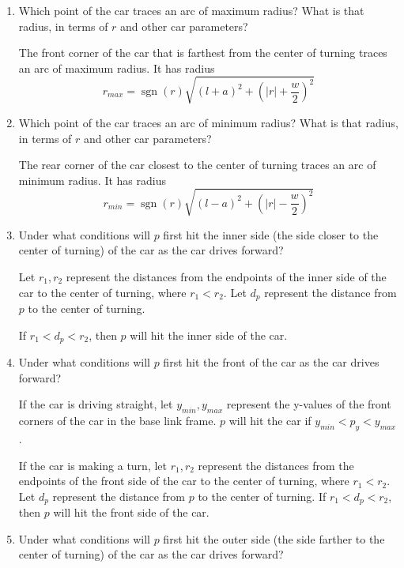 \documentclass[11pt]{article}
\DeclareMathOperator{\sgn}{sgn}
\begin{document}
\begin{enumerate}[leftmargin=*]
    \item
    Which point of the car traces an arc of maximum radius? What is that radius,
    in terms of $r$ and other car parameters?

    The front corner of the car that is farthest from the center of turning
    traces an arc of maximum radius. It has radius
    $$ r_{max} = \sgn(r) \sqrt{\left(l + a\right)^2 + \left(\lvert r \rvert + \frac{w}{2}\right)^2} $$

    \item
    Which point of the car traces an arc of minimum radius? What is that radius,
    in terms of $r$ and other car parameters?

    The rear corner of the car closest to the center of turning traces an
    arc of minimum radius. It has radius
    $$ r_{min} = \sgn(r) \sqrt{\left(l - a \right)^2 + \left(\lvert r \rvert - \frac{w}{2}\right)^2} $$

    \item
    Under what conditions will $p$ first hit the inner side (the side closer to
    the center of turning) of the car as the car drives forward?

    Let $r_1, r_2$ represent the distances from the endpoints of the inner side
    of the car to the center of turning, where $r_1 < r_2$.  Let $d_p$ represent
    the distance from $p$ to the center of turning.

    If $r_1 < d_p < r_2$, then $p$ will hit the inner side of the car.

    \item
    Under what conditions will $p$ first hit the front of the car as the car
    drives forward?

    If the car is driving straight, let $y_{min}, y_{max}$ represent the
    y-values of the front corners of the car in the base link frame. $p$ will
    hit the car if $y_{min} < p_y < y_{max}$.

    If the car is making a turn, let $r_1, r_2$ represent the distances from the
    endpoints of the front side of the car to the center of turning, where
    $r_1 < r_2$.  Let $d_p$ represent the distance from $p$ to the center of
    turning. If $r_1 < d_p < r_2$, then $p$ will hit the front side of the car.

    \item
    Under what conditions will $p$ first hit the outer side (the side farther to
    the center of turning) of the car as the car drives forward?


\end{enumerate}
\end{document}
